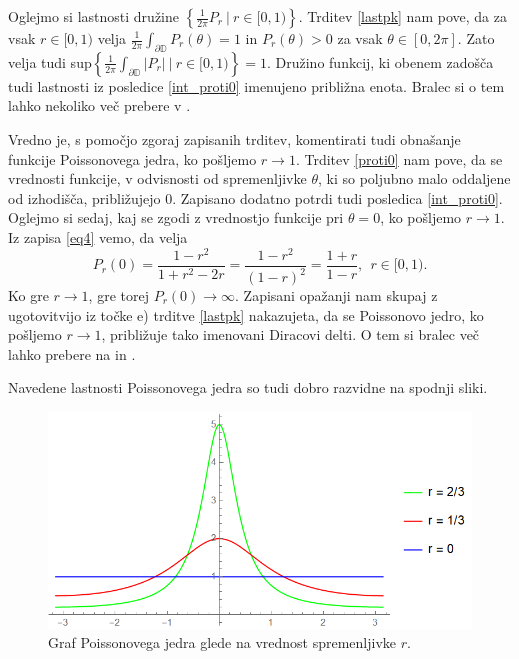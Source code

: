 \documentclass[mat1, tisk]{fmfdelo}
\begin{document}
    Oglejmo si lastnosti družine $\left\{ \frac{1}{2 \pi} P_r~|~r \in [0,1)\right\}$. Trditev \ref{lastpk} nam pove, da za vsak $r \in [0,1)$ velja $\frac{1}{2\pi}\int_{\partial \mathbb{D}}{P_r(\theta)} = 1$ in $P_r(\theta) > 0$ za vsak $\theta \in [0, 2 \pi]$.
    Zato velja tudi sup$\left\{\frac{1}{2 \pi}\int_{\partial \mathbb{D}}{\left| P_{r}\right|}~|~r \in [0,1)\right\}= 1$. Družino funkcij, ki obenem zadošča tudi lastnosti iz posledice \ref{int_proti0} imenujeno približna enota. 
    Bralec si o tem lahko nekoliko več prebere v \cite{kumaresan}.
 
    Vredno je, s pomočjo zgoraj zapisanih trditev, komentirati tudi obnašanje funkcije Poissonovega jedra, ko pošljemo $r \to 1$. Trditev \ref{proti0} nam pove, da se vrednosti funkcije, v odvisnosti od spremenljivke $\theta$, ki so poljubno malo oddaljene od izhodišča, približujejo $0$. 
    Zapisano dodatno potrdi tudi posledica \ref{int_proti0}.
    Oglejmo si sedaj, kaj se zgodi z vrednostjo funkcije pri $\theta = 0$, ko pošljemo $r \to 1$. Iz zapisa \eqref{eq4} vemo, da velja
    $$
    P_r(0) = \frac{1-r^2}{1+ r^2 - 2r} = \frac{1- r^2}{(1 - r)^2} = \frac{1 + r}{1 -r},~~r \in [0,1).
    $$
    Ko gre $r \to 1$, gre torej $P_r(0) \to \infty$. Zapisani opažanji nam skupaj z ugotovitvijo iz točke e) trditve \ref{lastpk} nakazujeta, da se Poissonovo jedro, ko pošljemo $r \to 1$, približuje tako imenovani Diracovi delti. 
    O tem si bralec več lahko prebere na \cite{math_world_dd} in \cite{wiki_dd}.

    Navedene lastnosti Poissonovega jedra so tudi dobro razvidne na spodnji sliki. 

    \begin{figure}[H]
        \begin{center}
        \includegraphics[width=\textwidth]{grafi.png}
        \caption{Graf Poissonovega jedra glede na vrednost spremenljivke $r$.}
        \end{center}    
    \end{figure}
\end{document}
